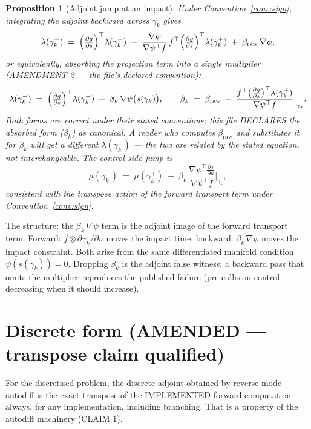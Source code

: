 \documentclass[11pt]{article}
\newtheorem{proposition}{Proposition}
\begin{document}
\begin{proposition}[Adjoint jump at an impact]
\label{prop:jump}
Under Convention~\ref{conv:sign}, integrating the adjoint backward
across $\gamma_k$ gives
\begin{equation}
  \lambda(\gamma_k^-) \;=\;
  \Bigl(\tfrac{\partial g}{\partial s}\Bigr)^\top \lambda(\gamma_k^+)
  \;-\;
  \frac{\nabla\psi}{\nabla\psi^\top f}\,
    f^\top \Bigl(\tfrac{\partial g}{\partial s}\Bigr)^\top
    \lambda(\gamma_k^+)
  \;+\;
  \beta_{\mathrm{raw}} \, \nabla\psi,
\end{equation}
or equivalently, absorbing the projection term into a single
multiplier (AMENDMENT 2 — the file's declared convention):
\begin{equation}
  \lambda(\gamma_k^-) \;=\;
  \Bigl(\tfrac{\partial g}{\partial s}\Bigr)^\top \lambda(\gamma_k^+)
  \;+\;
  \beta_k \, \nabla\psi\bigl(s(\gamma_k)\bigr),
  \qquad
  \beta_k \;=\;
  \beta_{\mathrm{raw}}
  \;-\;
  \frac{f^\top\bigl(\tfrac{\partial g}{\partial s}\bigr)^\top
        \lambda(\gamma_k^+)}
       {\nabla\psi^\top f}\Big|_{\gamma_k}.
\end{equation}
Both forms are correct under their stated conventions; this file
DECLARES the absorbed form ($\beta_k$) as canonical. A reader who
computes $\beta_{\mathrm{raw}}$ and substitutes it for $\beta_k$ will
get a different $\lambda(\gamma_k^-)$ — the two are related by the
stated equation, not interchangeable. The control-side jump is
\begin{equation}
  \mu(\gamma_k^-) \;=\;
  \mu(\gamma_k^+) \;+\;
  \beta_k\,
  \frac{\nabla\psi^\top \tfrac{\partial s}{\partial u}}
       {\nabla\psi^\top f}\Big|_{\gamma_k},
\end{equation}
consistent with the transpose action of the forward transport term
under Convention~\ref{conv:sign}.
\end{proposition}

The structure: the $\beta_k\,\nabla\psi$ term is the adjoint image
of the forward transport term. Forward: $f \otimes
\partial\gamma_k/\partial u$ moves the impact time; backward:
$\beta_k\,\nabla\psi$ moves the impact constraint. Both arise from
the same differentiated manifold condition $\psi(s(\gamma_k))=0$.
Dropping $\beta_k$ is the adjoint false witness: a backward pass
that omits the multiplier reproduces the published failure
(pre-collision control decreasing when it should increase).

\section{Discrete form (AMENDED — transpose claim qualified)}
For the discretised problem, the discrete adjoint obtained by
reverse-mode autodiff is the exact transpose of the IMPLEMENTED
forward computation — always, for any implementation, including
branching. That is a property of the autodiff machinery (CLAIM 1).
\end{document}
